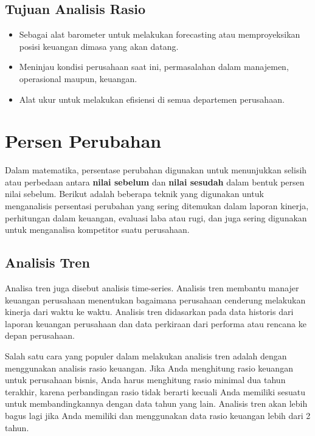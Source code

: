 \documentclass[
]{book}
\providecommand{\tightlist}{%
  \setlength{\itemsep}{0pt}\setlength{\parskip}{0pt}}
\begin{document}
\hypertarget{tujuan-analisis-rasio}{%
\subsection{Tujuan Analisis Rasio}\label{tujuan-analisis-rasio}}

\begin{itemize}
\tightlist
\item
  Sebagai alat barometer untuk melakukan forecasting atau memproyeksikan posisi keuangan dimasa yang akan datang.
\item
  Meninjau kondisi perusahaan saat ini, permasalahan dalam manajemen, operasional maupun, keuangan.
\item
  Alat ukur untuk melakukan efisiensi di semua departemen perusahaan.
\end{itemize}

\hypertarget{persen-perubahan}{%
\section{Persen Perubahan}\label{persen-perubahan}}

Dalam matematika, persentase perubahan digunakan untuk menunjukkan selisih atau perbedaan antara \textbf{nilai sebelum} dan \textbf{nilai sesudah} dalam bentuk persen nilai sebelum. Berikut adalah beberapa teknik yang digunakan untuk menganalisis persentasi perubahan yang sering ditemukan dalam laporan kinerja, perhitungan dalam keuangan, evaluasi laba atau rugi, dan juga sering digunakan untuk menganalisa kompetitor suatu perusahaan.

\hypertarget{analisis-tren}{%
\subsection{Analisis Tren}\label{analisis-tren}}

Analisa tren juga disebut analisis time-series. Analisis tren membantu manajer keuangan perusahaan menentukan bagaimana perusahaan cenderung melakukan kinerja dari waktu ke waktu. Analisis tren didasarkan pada data historis dari laporan keuangan perusahaan dan data perkiraan dari performa atau rencana ke depan perusahaan.

Salah satu cara yang populer dalam melakukan analisis tren adalah dengan menggunakan analisis rasio keuangan. Jika Anda menghitung rasio keuangan untuk perusahaan bisnis, Anda harus menghitung rasio minimal dua tahun terakhir, karena perbandingan rasio tidak berarti kecuali Anda memiliki sesuatu untuk membandingkannya dengan data tahun yang lain. Analisis tren akan lebih bagus lagi jika Anda memiliki dan menggunakan data rasio keuangan lebih dari 2 tahun.
\end{document}
